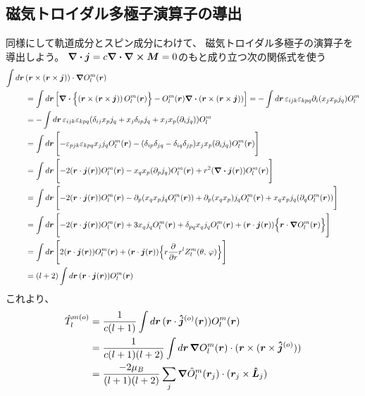 \documentclass[../../master.tex]{subfiles}
\begin{document}
\subsection{磁気トロイダル多極子演算子の導出}
同様にして軌道成分とスピン成分にわけて、
磁気トロイダル多極子の演算子を導出しよう。
\(\div \vb*{j}= c\div \curl \vb*{M}=0\)のもと成り立つ次の関係式を使う
\begin{align}
    \int d\vb*{r}\,& (\vb*{r}\times(\vb*{r}\times \vb*{j})) \cdot \grad O_l^m(\vb*{r}) \notag\\
    &= \int d\vb*{r}\, \qty[\div\Bigl\{(\vb*{r}\times(\vb*{r}\times \vb*{j}))\,O_l^m(\vb*{r})\Bigr\}
    -O_l^m(\vb*{r})\div(\vb*{r}\times(\vb*{r}\times \vb*{j}))]
    = - \int d\vb*{r}\, \varepsilon_{ijk}\varepsilon_{kpq}\partial_i(x_j x_p j_q)O_l^m\\
    &= - \int d\vb*{r}\, \varepsilon_{ijk}\varepsilon_{kpq}(\delta_{ij}x_p j_q + x_j \delta_{ip} j_q + x_j x_p( \partial_i j_q))O_l^m\\
    &= \int d\vb*{r}\,\Biggl[- \varepsilon_{pjk}\varepsilon_{kpq} x_j j_q O_l^m(\vb*{r})
    - (\delta_{ip}\delta_{jq}-\delta_{iq}\delta_{jp})x_j x_p (\partial_i j_q) O_l^m(\vb*{r})\Biggr]\\
    &= \int d\vb*{r}\,\Biggl[ -2(\vb*{r}\cdot\vb*{j}(\vb*{r})) O_l^m(\vb*{r})
    - x_q x_p (\partial_p j_q) O_l^m(\vb*{r})
    + r^2(\div \vb*{j}(\vb*{r})) O_l^m(\vb*{r}) \Biggr]\\
    &= \int d\vb*{r}\, \Biggl[-2(\vb*{r}\cdot\vb*{j}(\vb*{r})) O_l^m(\vb*{r})
    - \partial_p\qty( x_q x_p j_q O_l^m(\vb*{r}))
    + \partial_p(x_q x_p) j_q O_l^m(\vb*{r})
    + x_q x_p j_q (\partial_q O_l^m(\vb*{r})) \Biggr]\\
    &= \int d\vb*{r}\, \Biggl[-2(\vb*{r}\cdot\vb*{j}(\vb*{r})) O_l^m(\vb*{r})
    + 3 x_q j_q O_l^m(\vb*{r})
    + \delta_{pq}x_q j_q O_l^m(\vb*{r})
    + (\vb*{r}\cdot \vb*{j}(\vb*{r})) \Bigl\{\vb*{r}\cdot \grad O_l^m(\vb*{r})\Bigr\}\Biggr]\\
    &= \int d\vb*{r}\, \Biggl[2(\vb*{r}\cdot\vb*{j}(\vb*{r})) O_l^m(\vb*{r})
    + (\vb*{r}\cdot \vb*{j}(\vb*{r})) \Bigl\{r\pdv{r}r^l Z_l^m(\theta,\,\varphi)\Bigr\}\Biggr]\\
    &= (l+2)\int d\vb*{r}\, (\vb*{r}\cdot\vb*{j}(\vb*{r})) O_l^m(\vb*{r})
\end{align}
これより、
\begin{align}
    \hat{T}_l^{m(o)} &= \frac{1}{c(l+1)} \int d\vb*{r}\, (\vb*{r}\cdot \vb*{\hat{j}}^{(o)}(\vb*{r}))O_l^m(\vb*{r})\\
    &=\frac{1}{c(l+1)(l+2)}\int d\vb*{r}\, \grad O_l^m(\vb*{r}) \cdot (\vb*{r}\times(\vb*{r}\times \vb*{\hat{j}}^{(o)})) \\
    &= \frac{-2\mu_B}{(l+1)(l+2)}\sum_j \grad \hat{O}_l^m(\vb*{r}_j) \cdot (\vb*{r}_j\times \vb*{\hat{L}}_j)
\end{align}
\end{document}
